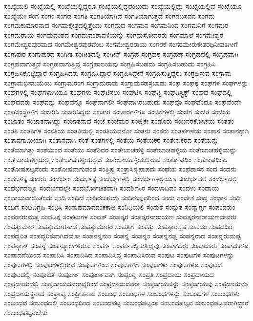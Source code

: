 {ಸಂಖ್ಯೆಯಲಿ
ಸಂಖ್ಯೆಯಲ್ಲಿ
ಸಂಖ್ಯೆಯಲ್ಲಿದ್ದರೂ
ಸಂಖ್ಯೆಯಲ್ಲಿದ್ದರೆಂಬುದು
ಸಂಖ್ಯೆಯಲ್ಲಿದ್ದು
ಸಂಖ್ಯೆಯಲ್ಲಿವೆ
ಸಂಖ್ಯೆಯೂ
ಸಂಖ್ಯೆಯೇ
ಸಂಗ
ಸಂಗಂ
ಸಂಗಡ
ಸಂಗತಿ
ಸಂಗತಿಯಾಗಿದೆ
ಸಂಗತಿಯಾಗುತ್ತದೆ
ಸಂಗನಬಸವನ
ಸಂಗಮ
ಸಂಗಮಕುಮಾರನಾದ
ಸಂಗಮಕ್ಷೇತ್ರದಲ್ಲಿತ್ತೆಂದು
ಸಂಗಮದ
ಸಂಗಮನ
ಸಂಗಮನಿಂದ
ಸಂಗಮನಿಗೆ
ಸಂಗಮರ
ಸಂಗಮರಾಯ
ಸಂಗಮವಂಶದ
ಸಂಗಮವಂಶಾವಳಿಯನ್ನು
ಸಂಗಮಸೋದರರು
ಸಂಗಮಾಲೆ
ಸಂಗಮೇಶ್ವರ
ಸಂಗಮೇಶ್ವರಪುರವಾದ
ಸಂಗಮೇಶ್ವರಪುರವೆಂಬ
ಸಂಗಮೇಶ್ವರರಾಯ
ಸಂಗರಕೆ
ಸಂಗರಮೇರುಕೇತರಥಿನೀಪತಿಗೀಗೆ
ಸಂಗಾಪುರ
ಸಂಗಾಪುರದ
ಸಂಗೀತ
ಸಂಗೀತದಲ್ಲಿ
ಸಂಗೀನ್
ಸಂಗ್ರಹ
ಸಂಗ್ರಹಕ್ಕೆ
ಸಂಗ್ರಹಣೆ
ಸಂಗ್ರಹದಲ್ಲಿ
ಸಂಗ್ರಹವಾಗಿ
ಸಂಗ್ರಹವಾಗುತ್ತದೆ
ಸಂಗ್ರಹವಾಗುತ್ತಿದ್ದ
ಸಂಗ್ರಹಾಲಯವು
ಸಂಗ್ರಹಿಸಬಹದು
ಸಂಗ್ರಹಿಸಬಹುದು
ಸಂಗ್ರಹಿಸಿ
ಸಂಗ್ರಹಿಸಿಕೊಟ್ಟಿದ್ದಾರೆ
ಸಂಗ್ರಹಿಸಿದರು
ಸಂಗ್ರಹಿಸಿದ್ದಾರೆ
ಸಂಗ್ರಹಿಸಿದ್ದೇನೆ
ಸಂಗ್ರಹಿಸುತ್ತಿದ್ದರು
ಸಂಗ್ರಹಿಸುವ
ಸಂಗ್ರಾಮ
ಸಂಗ್ರಾಮಭೀಮಯೆಂಬ
ಸಂಗ್ರಾಮರಂಗ
ಸಂಗ್ರಾಮರಾಮ
ಸಂಗ್ರಾಮಸಹಸ್ರಬಾಹು
ಸಂಘ
ಸಂಘಕ್ಕೆ
ಸಂಘಗಳ
ಸಂಘಗಳನ್ನು
ಸಂಘಗಳಲ್ಲಿ
ಸಂಘಗಳಾಗಿಯೂ
ಸಂಘಗಳು
ಸಂಘಟಿಸಲು
ಸಂಘಟಿಸಿ
ಸಂಘಟ್ಟ
ಸಂಘಡಿಸ್ಟ್ರಿಕ್ಟ್
ಸಂಘದ
ಸಂಘದಲ್ಲಿ
ಸಂಘದವರು
ಸಂಘವನ್ನು
ಸಂಘವನ್ನೂ
ಸಂಘವಾಗಲೀ
ಸಂಘವಾಗಿರಬಹುದು
ಸಂಘವೂ
ಸಂಘವೆಂದೂ
ಸಂಘವೆಂದೇ
ಸಂಘಸಂಸ್ಥೆಗಳಿಗೆ
ಸಂಚರಿಸಿ
ಸಂಚರಿಸಿದ್ದರು
ಸಂಚಾರ
ಸಂಚಾರಗಳಿಗೂ
ಸಂಚಿಕೆಗಳಲ್ಲಿ
ಸಂಚಿಗ
ಸಂಚಿತ
ಸಂಚಿಯ
ಸಂಜಾತಂ
ಸಂಜಾತನಾಗಿದ್ದು
ಸಂಜಾತನಾದ
ಸಂಜೆ
ಸಂಜೆಮಠ
ಸಂಜ್ಞಿಕೇ
ಸಂಡೂರು
ಸಂಣನರಕೋಟೆಯ
ಸಂತತಂ
ಸಂತತಿ
ಸಂತತಿಗಳ
ಸಂತತಿಯ
ಸಂತತಿಯಲ್ಲಿ
ಸಂತತಿಯವನೋ
ಸಂತನು
ಸಂತರು
ಸಂತರ್ಪಣೆಯ
ಸಂತಾನ
ಸಂತಾನಕ್ಕಾಗಿ
ಸಂತಾನಗಾಮಿಯಾಗಿ
ಸಂತಾನವಾಗಿ
ಸಂತೆ
ಸಂತೆಗಳಲ್ಲಿ
ಸಂತೆಯ
ಸಂತೆಯಕರ
ಸಂತೆಯಕರದ
ಸಂತೆಯನ್ನು
ಸಂತೆಯಾಗಿತ್ತು
ಸಂತೆಯಿಂದ
ಸಂತೆಯು
ಸಂತೆಶಿವರ
ಸಂತೇಬಾಚಹಳ್ಳಿ
ಸಂತೇಬಾಚಹಳ್ಳಿಯ
ಸಂತೇಬಾಚಹಳ್ಳಿಯನ್ನು
ಸಂತೇಬಾಚಹಳ್ಳಿಯಲ್ಲಿ
ಸಂತೇಬಾಚಹಳ್ಳಿಯಲ್ಲಿದೆ
ಸಂತೇಬಾಚಹಳ್ಳಿಯಲ್ಲಿರುವ
ಸಂತೋಷದಿಂ
ಸಂತೋಷದಿಂದ
ಸಂತೋಷಪಟ್ಟನೆಂದು
ಸಂತೋಷವಾಗುವಂತೆ
ಸಂತ್ತಿಷ್ಟ
ಸಂತ್ರಾಸಿನೃಪಾಪದಃ
ಸಂಥೆಯ
ಸಂಥೆಶಾಸನ
ಸಂದ
ಸಂದನು
ಸಂದಬಳಿಕ್ಕ
ಸಂದರು
ಸಂದರ್ಭಂ
ಸಂದರ್ಭಕ್ಕೆ
ಸಂದರ್ಭಗಳಲ್ಲಿ
ಸಂದರ್ಭಗಳಲ್ಲಿಯೂ
ಸಂದರ್ಭದಲಿ
ಸಂದರ್ಭದಲ್ಲಿ
ಸಂದರ್ಭದಲ್ಲೂ
ಸಂದರ್ಭದಲ್ಲೇ
ಸಂದರ್ಭೋಚಿತವಾಗಿ
ಸಂದರ್ಶಿಸಿರ
ಸಂದಳಾದಿವಂ
ಸಂದಳು
ಸಂದಾಯ
ಸಂದಾಯವಾಯಿತೆಂದು
ಸಂದಿ
ಸಂದಿದೆ
ಸಂದಿರಬಹುದು
ಸಂದಿರುವುದರಿಂದ
ಸಂದು
ಸಂದೇಶ
ಸಂದ್ರ
ಸಂಧಾನ
ಸಂಧಿ
ಸಂಧಿಗೆ
ಸಂಧಿವಿಗ್ರಹಿ
ಸಂಧಿಸಿ
ಸಂನಾಹಮಾವನಂಕಕಾಱ
ಸಂನಿಧಿಯಲಿ
ಸಂನುತೆ
ಸಂನ್ನುತ
ಸಂನ್ಮಾರ್ಗ್ಗ
ಸಂಪಂನರುಂ
ಸಂಪಂನರುಮಪ್ಪ
ಸಂಪಟಕ್ಕೆ
ಸಂಪಟುಗಳ
ಸಂಪತ್
ಸಂಪತ್ಕರ
ಸಂಪತ್ಕರನಾರಾಯಣ
ಸಂಪತ್ಕರನಾರಾಯಣದೇವರು
ಸಂಪತ್ಕುಮಾರ
ಸಂಪತ್ಕುಮಾರನಾದ
ಸಂಪತ್ಕುಮಾರರ
ಸಂಪತ್ತಿಗೆ
ಸಂಪತ್ತು
ಸಂಪತ್ಸಾರಸ್ವತ
ಸಂಪದಂ
ಸಂಪದದಿಂ
ಸಂಪದ್ಭರಿತ
ಸಂಪದ್ಭರಿತವಾಗಿದೆಯೋ
ಸಂಪನನ್ನನುಂ
ಸಂಪನ್ನ
ಸಂಪನ್ನಂ
ಸಂಪನ್ನನಪ್ಪ
ಸಂಪನ್ನರಾದ
ಸಂಪನ್ನರುಮಪ್ಪ
ಸಂಪನ್ನಾನ್
ಸಂಪನ್ನೆ
ಸಂಪನ್ಮೂಲಗಳಿರುವ
ಸಂಪರ್ಕ
ಸಂಪರ್ಕಕಲ್ಪಿಸುತ್ತಿದ್ದವು
ಸಂಪಾಕದರು
ಸಂಪಾದಕರು
ಸಂಪಾದಕರೂ
ಸಂಪಾದನೆಯಿಂದ
ಸಂಪಾದಿಸಿ
ಸಂಪಾದಿಸಿದ
ಸಂಪಾದಿಸಿದ್ದ
ಸಂಪಾದಿಸಿರುವ
ಸಂಪುಟ
ಸಂಪುಟಗಳ
ಸಂಪುಟಗಳನ್ನು
ಸಂಪುಟಗಳಲ್ಲಿ
ಸಂಪುಟಗಳಲ್ಲಿರುವ
ಸಂಪುಟಗಳಿಂದ
ಸಂಪುಟಗಳಿಗೆ
ಸಂಪುಟಗಳು
ಸಂಪುಟಗಳೂ
ಸಂಪುಟದ
ಸಂಪುಟದಲ್ಲಿ
ಸಂಪೂಜಿತೆ
ಸಂಪೂರ್ಣ
ಸಂಪೂರ್ಣವಾಗಿ
ಸಂಪ್ಪಂನ್ನ
ಸಂಪ್ರತಿ
ಸಂಪ್ರದಾಯ
ಸಂಪ್ರದಾಯದ
ಸಂಪ್ರದಾಯದಲ್ಲಿ
ಸಂಪ್ರದಾಯದವರಾದ್ದರಿಂದ
ಸಂಪ್ರದಾಯದವರೇ
ಸಂಪ್ರದಾಯವನ್ನು
ಸಂಪ್ರದಾಯವು
ಸಂಪ್ರದಾಯವೂ
ಸಂಪ್ರದಾಯಸ್ಥನಾದ
ಸಂಪ್ರಾಪ್ಯ
ಸಂಪ್ರೀತನಾದ
ಸಂಬಂಧ
ಸಂಬಂಧಗಳ
ಸಂಬಂಧಗಳನ್ನು
ಸಂಬಂಧಗಳಿ
ಸಂಬಂಧಗಳು
ಸಂಬಂಧದ
ಸಂಬಂಧದಲ್ಲಿ
ಸಂಬಂಧದಿಂದ
ಸಂಬಂಧಪಟ್ಟ
ಸಂಬಂಧಪಟ್ಟಂತೆ
ಸಂಬಂಧಪಟ್ಟವ
ಸಂಬಂಧಪಟ್ಟವರಾಗಿದ್ದಾರೆ
ಸಂಬಂಧಪಟ್ಟಿರಬೇಕು
}
